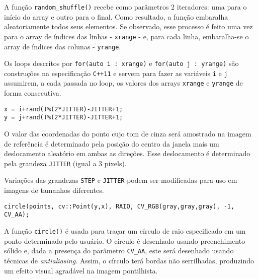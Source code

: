\documentclass[11pt]{amsbook}
\begin{document}
A função \texttt{random_shuffle()} recebe como parâmetros 2 iteradores: uma
para o início do array e outro para o final. Como resultado, a função
embaralha aleatoriamente todos seus elementos. Se observado, esse
processo é feito uma vez para o array de índices das linhas -
\texttt{xrange} - e, para cada linha, embaralha-se o array de índices das
colunas - \texttt{yrange}.


Os loops descritos por \texttt{for(auto i : xrange)} e \texttt{for(auto j : yrange)}
são construções na especificação \texttt{C++11} e servem para fazer as
variáveis \texttt{i} e \texttt{j} assumirem, a cada passada no loop, os valores dos
arrays \texttt{xrange} e \texttt{yrange} de forma consecutiva.


\begin{verbatim}
x = i+rand()%(2*JITTER)-JITTER+1;
y = j+rand()%(2*JITTER)-JITTER+1;
\end{verbatim}

O valor das coordenadas do ponto cujo tom de cinza será amostrado na
imagem de referência é determinado pela posição do centro da janela
mais um deslocamento aleatório em ambas as direções. Esse deslocamento
é determinado pela grandeza \texttt{JITTER} (igual a 3 pixels).


Variações das grandezas \texttt{STEP} e \texttt{JITTER} podem ser modificadas para
uso em imagens de tamanhos diferentes.


\begin{verbatim}
circle(points, cv::Point(y,x), RAIO, CV_RGB(gray,gray,gray), -1, CV_AA);
\end{verbatim}

A função \texttt{circle()} é usada para traçar um círculo de raio
especificado em um ponto determinado pelo usuário. O círculo é
desenhado usando preenchimento sólido e, dada a presença do parâmetro
\texttt{CV_AA}, este será desenhado usando técnicas de \emph{antialiasing}. Assim,
o círculo terá bordas não serrilhadas, produzindo um efeito visual
agradável na imagem pontilhista.
\end{document}
